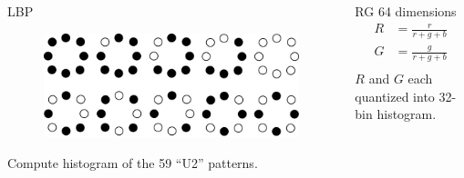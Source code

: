 \documentclass{beamer}
\begin{document}
\begin{frame}
\begin{columns}
\begin{column}{.3\textwidth}
\begin{block}{LBP}
\begin{figure}
\includegraphics[width=\textwidth]{LBPU2}
\end{figure}
Compute histogram of the 59 ``U2'' patterns.
\end{block}
\end{column}
\pause
\begin{column}{.3\textwidth}
\begin{block}{RG}
64 dimensions
\begin{equation}
\begin{split}
R &= \frac{r}{r+g+b} \\
G &= \frac{g}{r+g+b} \\
\end{split}
\end{equation}
$R$ and $G$ each quantized into 32-bin histogram.
\end{block}
\end{column}
\end{columns}
\end{frame}
\end{document}
